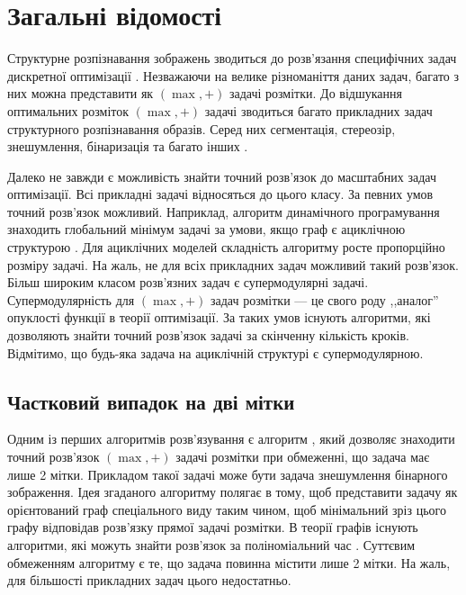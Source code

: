 \section{Загальні відомості}

\vspace{-\baselineskip}

Структурне розпізнавання зображень зводиться до розв'язання специфічних
задач дискретної оптимізації \cite{SchlGig_1_usim2007, Boykov, Boykov_2, savchynskyy}. Незважаючи на велике різноманіття даних задач,
багато з них можна представити як \((\max,+)\) задачі розмітки.
До відшукання оптимальних розміток \((\max,+)\) задачі зводиться багато
прикладних задач структурного розпізнавання образів. Серед них сегментація,
стереозір, знешумлення, бінаризація та багато інших \cite{WANG20131610, Boykov_2, comp_vision}.

Далеко не завжди є можливість знайти точний розв'язок до
масштабних задач оптимізації. Всі прикладні задачі відносяться до цього класу.
За певних умов точний розв'язок можливий. Наприклад, алгоритм динамічного програмування
знаходить глобальний мінімум задачі за умови, якщо граф є ациклічною
структурою \cite{ten_lectures}. Для ациклічних моделей складність алгоритму росте пропорційно
розміру задачі.
На жаль, не для всіх прикладних задач можливий такий розв'язок.
Більш широким класом розв'язних задач є супермодулярні задачі. Супермодулярність
для \((\max,+)\) задач розмітки --- це свого роду ,,аналог'' опуклості функції в теорії
оптимізації. За таких умов існують алгоритми, які дозволяють знайти
точний розв'язок задачі за скінченну кількість кроків.
Відмітимо, що будь-яка задача на ациклічній структурі є супермодулярною.

\subsection{Частковий випадок на дві мітки}
Одним із перших алгоритмів розв'язування є алгоритм \cite{Greig_port}, який
дозволяє знаходити точний розв'язок \((\max,+)\) задачі розмітки при обмеженні, що
задача має лише 2 мітки. Прикладом такої задачі може бути задача знешумлення
бінарного зображення.
Ідея згаданого алгоритму полягає в тому, щоб
представити задачу як орієнтований граф спеціального виду таким чином, щоб
мінімальний зріз цього графу відповідав розв'язку прямої задачі розмітки.
В теорії графів існують алгоритми, які можуть знайти розв'язок за поліноміальний
час \cite{Boykov, Boykov_2, ford}. Суттєвим обмеженням алгоритму є те, що задача повинна містити лише 2 мітки.
На жаль, для більшості прикладних задач цього недостатньо.


